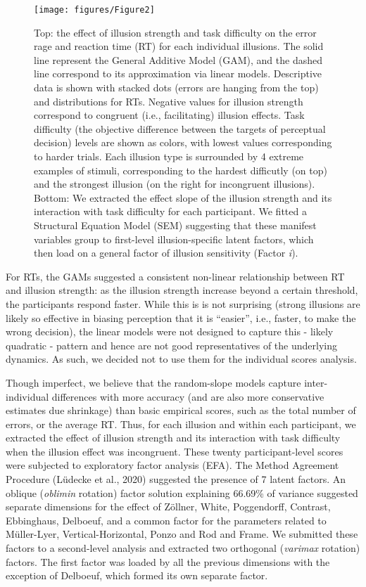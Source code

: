 \documentclass[
  man,floatsintext]{apa6}
\begin{document}
\begin{figure}
\texttt{[image: figures/Figure2]} \caption{Top: the effect of illusion strength and task difficulty on the error rage and reaction time (RT) for each individual illusions. The solid line represent the General Additive Model (GAM), and the dashed line correspond to its approximation via linear models. Descriptive data is shown with stacked dots (errors are hanging from the top) and distributions for RTs. Negative values for illusion strength correspond to congruent (i.e., facilitating) illusion effects. Task difficulty (the objective difference between the targets of perceptual decision) levels are shown as colors, with lowest values corresponding to harder trials. Each illusion type is surrounded by 4 extreme examples of stimuli, corresponding to the hardest difficutly (on top) and the strongest illusion (on the right for incongruent illusions). Bottom: We extracted the effect slope of the illusion strength and its interaction with task difficulty for each participant. We fitted a Structural Equation Model (SEM) suggesting that these manifest variables group to first-level illusion-specific latent factors, which then load on a general factor of illusion sensitivity (Factor \textit{i}).}\label{fig:unnamed-chunk-3}
\end{figure}

For RTs, the GAMs suggested a consistent non-linear relationship between RT and illusion strength: as the illusion strength increase beyond a certain threshold, the participants respond faster. While this is is not surprising (strong illusions are likely so effective in biasing perception that it is ``easier'', i.e., faster, to make the wrong decision), the linear models were not designed to capture this - likely quadratic - pattern and hence are not good representatives of the underlying dynamics. As such, we decided not to use them for the individual scores analysis.

Though imperfect, we believe that the random-slope models capture inter-individual differences with more accuracy (and are also more conservative estimates due shrinkage) than basic empirical scores, such as the total number of errors, or the average RT. Thus, for each illusion and within each participant, we extracted the effect of illusion strength and its interaction with task difficulty when the illusion effect was incongruent. These twenty participant-level scores were subjected to exploratory factor analysis (EFA). The Method Agreement Procedure (Lüdecke et al., 2020) suggested the presence of 7 latent factors. An oblique (\emph{oblimin} rotation) factor solution explaining 66.69\% of variance suggested separate dimensions for the effect of Zöllner, White, Poggendorff, Contrast, Ebbinghaus, Delboeuf, and a common factor for the parameters related to Müller-Lyer, Vertical-Horizontal, Ponzo and Rod and Frame. We submitted these factors to a second-level analysis and extracted two orthogonal (\emph{varimax} rotation) factors. The first factor was loaded by all the previous dimensions with the exception of Delboeuf, which formed its own separate factor.
\end{document}
